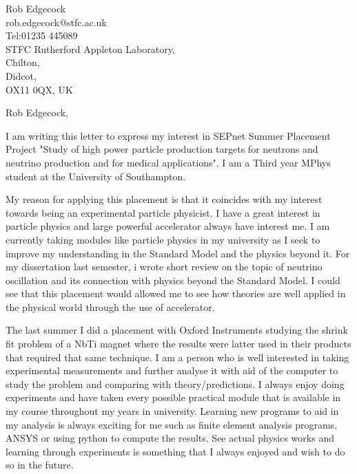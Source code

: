 \documentclass[11pt]{letter} %
\begin{document}

\begin{letter}{Rob Edgecock\\rob.edgecock@stfc.ac.uk\\Tel:01235 445089\\STFC Rutherford Appleton Laboratory,\\Chilton,\\Didcot,\\OX11 0QX, UK}


\opening{Rob Edgecock,} 

I am writing this letter to express my interest in SEPnet Summer Placement Project "Study of high power particle production targets for neutrons and neutrino production and for medical applications". I am a Third year MPhys student at the University of Southampton.

My reason for applying this placement is that it coincides with my interest towards being an experimental particle physicist. I have a great interest in particle physics and large powerful accelerator always have interest me. I am currently taking modules like particle physics in my university as I seek to improve my understanding in the Standard Model and the physics beyond it. For my dissertation last semester, i wrote short review on the topic of neutrino oscillation and its connection with physics beyond the Standard Model. I could see that this placement would allowed me to see how theories are well applied in the physical world through the use of accelerator.

The last summer I did a placement with Oxford Instruments studying the shrink fit problem of a NbTi magnet where the results were latter used in their products that required that same technique. I am a person who is well interested in taking experimental measurements and further analyse it with aid of the computer to study the problem and comparing with theory/predictions. I always enjoy doing experiments and have taken every possible practical module that is available in my course throughout my years in university. Learning new programs to aid in my analysis is always exciting for me such as finite element analysis programs, ANSYS or using python to compute the results. See actual physics works and learning through experiments is something that I always enjoyed and wish to do so in the future.


\end{letter}
\end{document}
